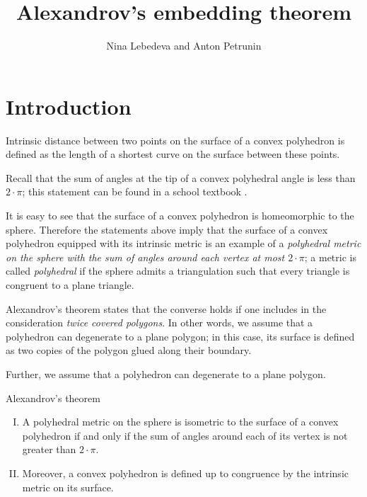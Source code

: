 \documentclass[oneside,a4paper]{article}
\begin{document}

\title{Alexandrov's embedding theorem}
\author{Nina Lebedeva and Anton Petrunin}
\date{}
\maketitle

\section{Introduction}

Intrinsic distance between two points on the surface of a convex polyhedron is defined as the length of a shortest curve on the surface between these points.

Recall that the sum of angles at the tip of a convex polyhedral angle is less than $2\cdot\pi$;
this statement can be found in a school textbook \cite[§~48]{kiselyov-3D}.

It is easy to see that the surface of a convex polyhedron is homeomorphic to the sphere.
Therefore the statements above imply that the surface of a convex polyhedron equipped with its intrinsic metric is an example of a \emph{polyhedral metric on the sphere with the sum of angles around each vertex at most $2\cdot\pi$};
a metric is called \emph{polyhedral} if the sphere admits a triangulation such that every triangle is congruent to a plane triangle.

Alexandrov's theorem states that the converse holds if one includes in the consideration \emph{twice covered polygons}.
In other words, we assume that a polyhedron can degenerate to a plane polygon;
in this case, its surface is defined as two copies of the polygon glued along their boundary.

Further, we assume that a polyhedron can degenerate to a plane polygon.

\begin{thm}{Alexandrov's theorem}
\begin{enumerate}[I.]
\item\label{thm:exist}
A polyhedral metric on the sphere is isometric to the surface of a convex polyhedron if and only if the sum of angles around each of its vertex is not greater than $2\cdot\pi$.

\item\label{thm:unique} 
Moreover, a convex polyhedron is defined up to congruence by the intrinsic metric on its surface.
\end{enumerate}

\end{thm}
\end{document}
